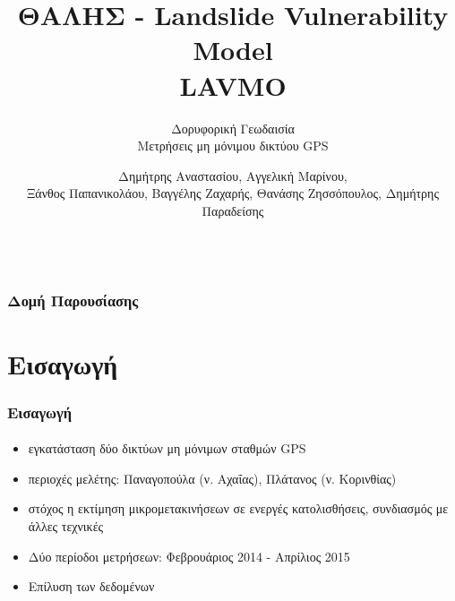 \documentclass{beamer}
\title{ΘΑΛΗΣ - Landslide Vulnerability Model \\ LAVMO}
\subtitle{Δορυφορική Γεωδαισία \\ Μετρήσεις μη μόνιμου δικτύου GPS}
\date{}
\author{Δημήτρης Αναστασίου, Αγγελική Μαρίνου,\\ Ξάνθος Παπανικολάου, Βαγγέλης Ζαχαρής, Θανάσης Ζησσόπουλος, Δημήτρης Παραδείσης}
\institute{Εθνικό Μετσόβιο Πολυτεχνείο\\Κέντρο Δορυφόρων Διονύσου\\\url{http://dionysos.survey.ntua.gr}}
\begin{document}

\begin{frame}[plain]
\maketitle
\begin{block}{}
\begin{columns}[T] %
\end{columns}
\end{block}
\end{frame}

\begin{frame}
    \frametitle{Δομή Παρουσίασης}
    \tableofcontents
\end{frame}

\section{Εισαγωγή}

\begin{frame}\frametitle{Εισαγωγή}\framesubtitle{}
\begin{itemize}
	\item εγκατάσταση δύο δικτύων μη μόνιμων σταθμών GPS 
	\item περιοχές μελέτης: Παναγοπούλα (ν. Αχαΐας), Πλάτανος (ν. Κορινθίας)
	\item στόχος η εκτίμηση μικρομετακινήσεων σε ενεργές κατολισθήσεις, συνδιασμός με άλλες τεχνικές
	\item Δύο περίοδοι μετρήσεων: Φεβρουάριος 2014 - Απρίλιος 2015
	\item Επίλυση των δεδομένων
\end{itemize}

\end{frame}
\end{document}
